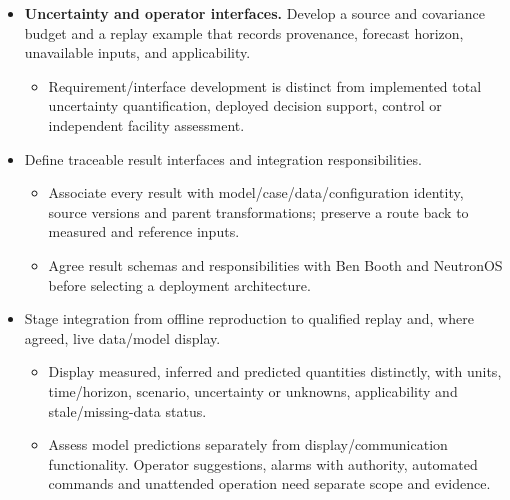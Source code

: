 \begin{itemize}[leftmargin=*]
\item {}\textbf{Uncertainty and operator interfaces.} Develop a source and covariance budget and a replay example that records provenance, forecast horizon, unavailable inputs, and applicability.
\begin{itemize}
\item Requirement/\allowbreak{}interface development is distinct from implemented total uncertainty quantification, deployed decision support, control or independent facility assessment.
\end{itemize}

\item Define traceable result interfaces and integration responsibilities.
\begin{itemize}
\item Associate every result with model/\allowbreak{}case/\allowbreak{}data/\allowbreak{}configuration identity, source versions and parent transformations; preserve a route back to measured and reference inputs.
\item Agree result schemas and responsibilities with Ben Booth and NeutronOS before selecting a deployment architecture.
\end{itemize}
\item Stage integration from offline reproduction to qualified replay and, where agreed, live data/\allowbreak{}model display.
\begin{itemize}
\item Display measured, inferred and predicted quantities distinctly, with units, time/\allowbreak{}horizon, scenario, uncertainty or unknowns, applicability and stale/\allowbreak{}missing-data status.
\item Assess model predictions separately from display/\allowbreak{}communication functionality. Operator suggestions, alarms with authority, automated commands and unattended operation need separate scope and evidence.
\end{itemize}


\end{itemize}
